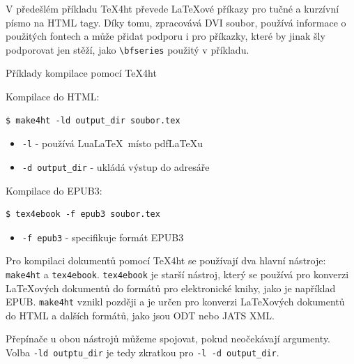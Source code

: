 V předešlém příkladu \TeX4ht převede LaTeXové příkazy pro tučné a kurzívní písmo na HTML tagy.
Díky tomu, zpracovává DVI soubor, používá informace o použitých fontech a může 
přidat podporu i pro příkazky, které by jinak šly podporovat jen stěží, jako 
\verb|\bfseries| použitý v příkladu.



\begin{frame}[fragile]{Příklady kompilace pomocí TeX4ht}

\begin{block}{Kompilace do HTML:}
\begin{verbatim}
$ make4ht -ld output_dir soubor.tex
\end{verbatim}
\end{block}



\begin{itemize}
    \item \texttt{-l} - používá Lua\LaTeX\ místo pdf\LaTeX u
    \item \texttt{-d output\_dir} - ukládá výstup do adresáře
\end{itemize}

\begin{block}{Kompilace do EPUB3:}
\begin{verbatim}
$ tex4ebook -f epub3 soubor.tex
\end{verbatim}
\end{block}

\begin{itemize}
    \item \texttt{-f epub3} - specifikuje formát EPUB3
\end{itemize}
\end{frame}

Pro kompilaci dokumentů pomocí \TeX4ht se používají dva hlavní nástroje: \texttt{make4ht} a \texttt{tex4ebook}.
\texttt{tex4ebook} je starší nástroj, který se používá pro konverzi LaTeXových
dokumentů do formátů pro elektronické knihy, jako je například EPUB.
\texttt{make4ht} vznikl později a je určen pro konverzi LaTeXových dokumentů do
HTML a dalších formátů, jako jsou ODT nebo JATS XML.

Přepínače u obou nástrojů můžeme spojovat, pokud neočekávají argumenty. 
Volba \verb|-ld outptu_dir| je tedy zkratkou pro \verb|-l -d output_dir|.



